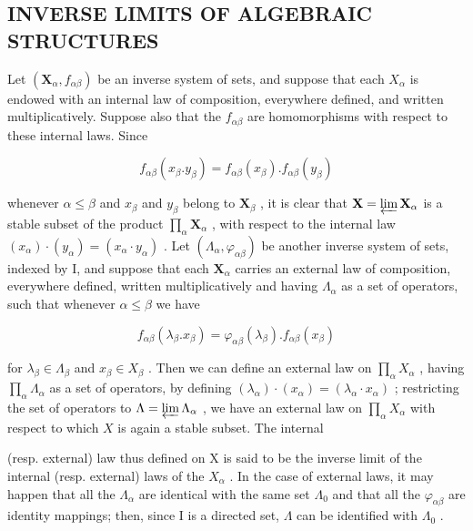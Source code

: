 \subsection{INVERSE LIMITS OF ALGEBRAIC STRUCTURES}

Let \((\mathbf{X}_{\alpha}, f_{\alpha\beta})\) be an inverse system of sets, and suppose that each \(X_{\alpha}\) is endowed with an internal law of composition, everywhere defined, and written multiplicatively. Suppose also that the \(f_{\alpha\beta}\) are homomorphisms with respect to these internal laws. Since

\[
f _ {\alpha \beta} (x _ {\beta}. y _ {\beta}) = f _ {\alpha \beta} (x _ {\beta}). f _ {\alpha \beta} (y _ {\beta})
\]

whenever \(\alpha \leqslant \beta\) and \(x_{\beta}\) and \(y_{\beta}\) belong to \(\mathbf{X}_{\beta}\) , it is clear that \(\mathbf{X} = \varprojlim \mathbf{X}_{\alpha}\) is a stable subset of the product \(\prod_{\alpha} \mathbf{X}_{\alpha}\) , with respect to the internal law \((x_{\alpha}) \cdot (y_{\alpha}) = (x_{\alpha} \cdot y_{\alpha})\) . Let \((\Lambda_{\alpha}, \varphi_{\alpha\beta})\) be another inverse system of sets, indexed by I, and suppose that each \(\mathbf{X}_{\alpha}\) carries an external law of composition, everywhere defined, written multiplicatively and having \(\Lambda_{\alpha}\) as a set of operators, such that whenever \(\alpha \leqslant \beta\) we have

\[
f _ {\alpha \beta} (\lambda_ {\beta}. x _ {\beta}) = \varphi_ {\alpha \beta} (\lambda_ {\beta}). f _ {\alpha \beta} (x _ {\beta})
\]

for \(\lambda_{\beta} \in \Lambda_{\beta}\) and \(x_{\beta} \in X_{\beta}\) . Then we can define an external law on \(\prod_{\alpha} X_{\alpha}\) , having \(\prod_{\alpha} \Lambda_{\alpha}\) as a set of operators, by defining \((\lambda_{\alpha}) \cdot (x_{\alpha}) = (\lambda_{\alpha} \cdot x_{\alpha})\) ; restricting the set of operators to \(\Lambda = \varprojlim \Lambda_{\alpha}\) , we have an external law on \(\prod_{\alpha} X_{\alpha}\) with respect to which \(X\) is again a stable subset. The internal

(resp. external) law thus defined on X is said to be the inverse limit of the internal (resp. external) laws of the \(X_{\alpha}\) . In the case of external laws, it may happen that all the \(\Lambda_{\alpha}\) are identical with the same set \(\Lambda_{0}\) and that all the \(\varphi_{\alpha \beta}\) are identity mappings; then, since I is a directed set, \(\Lambda\) can be identified with \(\Lambda_0\) .

